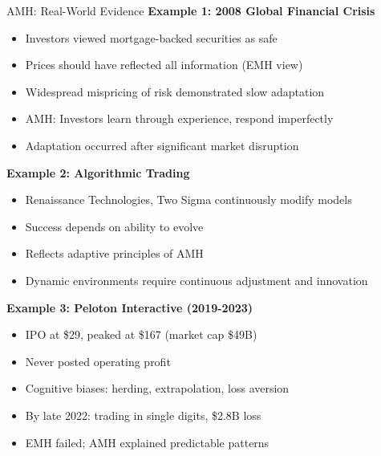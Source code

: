\documentclass[aspectratio=169,10pt]{beamer}
\renewcommand{\small}{\fontsize{7pt}{8.5pt}\selectfont}
\renewcommand{\large}{\fontsize{9pt}{11pt}\selectfont}
\newcommand{\question}[1]{{\large\bfseries\color{crimson}#1}}
\begin{document}
	\begin{frame}{AMH: Real-World Evidence}
		\question{Example 1: 2008 Global Financial Crisis}
		\small
		\begin{itemize}
			\item Investors viewed mortgage-backed securities as safe
			\item Prices should have reflected all information (EMH view)
			\item Widespread mispricing of risk demonstrated slow adaptation
			\item AMH: Investors learn through experience, respond imperfectly
			\item Adaptation occurred after significant market disruption
		\end{itemize}
		
		\vspace{0.1cm}
		\question{Example 2: Algorithmic Trading}
		\small
		\begin{itemize}
			\item Renaissance Technologies, Two Sigma continuously modify models
			\item Success depends on ability to evolve
			\item Reflects adaptive principles of AMH
			\item Dynamic environments require continuous adjustment and innovation
		\end{itemize}
		
		\vspace{0.1cm}
		\question{Example 3: Peloton Interactive (2019-2023)}
		\small
		\begin{itemize}
			\item IPO at \$29, peaked at \$167 (market cap \$49B)
			\item Never posted operating profit
			\item Cognitive biases: herding, extrapolation, loss aversion
			\item By late 2022: trading in single digits, \$2.8B loss
			\item EMH failed; AMH explained predictable patterns
		\end{itemize}
	\end{frame}
	
	
\end{document}
